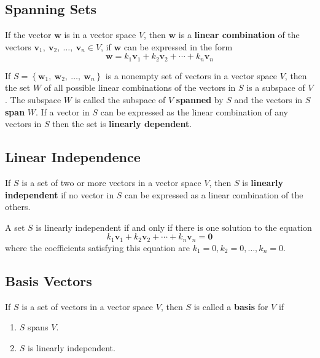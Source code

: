 \documentclass{article}
\begin{document}
\subsection{Spanning Sets}
\begin{definition}
    If the vector \(\symbf{w}\) is in a vector space \(V\), then
    \(\symbf{w}\) is a \textbf{linear combination} of the vectors
    \(\symbf{v}_1,\: \symbf{v}_2,\: \dots,\: \symbf{v}_n \in V\),
    if \(\symbf{w}\) can be expressed in the form
    \begin{equation*}
        \symbf{w} = k_1 \symbf{v}_1 + k_2 \symbf{v}_2 + \cdots + k_n \symbf{v}_n
    \end{equation*}
\end{definition}
\begin{theorem}
    If \(S=\left\{ \symbf{w}_1,\: \symbf{w}_2,\: \dots,\: \symbf{w}_n \right\}\)
    is a nonempty set of vectors in a vector space \(V\), then the set
    \(W\) of all possible linear combinations of the vectors in \(S\) is
    a subspace of \(V\). The subspace \(W\) is called the subspace of
    \(V\) \textbf{spanned} by \(S\) and the vectors in \(S\)
    \textbf{span} \(W\). If a vector in \(S\) can be expressed as the
    linear combination of any vectors in \(S\) then the set is
    \textbf{linearly dependent}.
\end{theorem}
\subsection{Linear Independence}
\begin{definition}
    If \(S\) is a set of two or more vectors in a vector space \(V\),
    then \(S\) is \textbf{linearly independent} if no vector in \(S\)
    can be expressed as a linear combination of the others.
\end{definition}
\begin{theorem}
    A set \(S\) is linearly independent if and only if there is one
    solution to the equation
    \begin{equation*}
        k_1 \symbf{v}_1 + k_2 \symbf{v}_2 + \cdots + k_n \symbf{v}_n = \symbf{0}
    \end{equation*}
    where the coefficients satisfying this equation are
    \(k_1=0, k_2=0, \dots, k_n=0\).
\end{theorem}
\subsection{Basis Vectors}
\begin{definition}
    If \(S\) is a set of vectors in a vector space \(V\), then \(S\) is
    called a \textbf{basis} for \(V\) if
    \begin{enumerate}
        \item \(S\) spans \(V\).
        \item \(S\) is linearly independent.
    \end{enumerate}
\end{definition}
\end{document}
